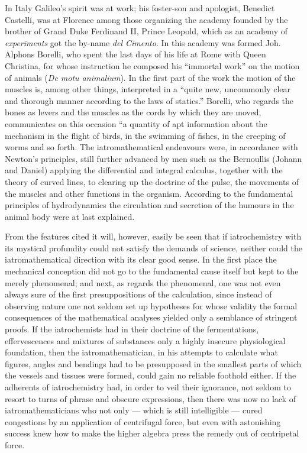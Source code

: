 \documentclass[12pt,a4paper]{book}
\begin{document}
In Italy Galileo's spirit was at work; his foster-son and apologist, Benedict
Castelli, was at Florence among those organizing the academy founded by the
brother of Grand Duke Ferdinand II, Prince Leopold, which as an academy of
\emph{experiments} got the by-name \textit{del Cimento}. In this academy was
formed Joh. Alphons Borelli, who spent the last days of his life at Rome with
Queen Christina, for whose instruction he composed his ``immortal work'' on the
motion of animals (\textit{De motu animalium}). In the first part of the work
the motion of the muscles is, among other things, interpreted in a ``quite new,
uncommonly clear
and thorough manner according to the laws of statics.'' Borelli, who regards
the bones as levers and the muscles as the cords by which they are moved,
communicates on this occasion ``a quantity of apt information about the
mechanism in the flight of birds, in the swimming of fishes, in the creeping of
worms
and so forth.
The iatromathematical endeavours were, in accordance with Newton's principles,
still further advanced by men such as the Bernoullis (Johann and Daniel)
applying the differential and integral calculus, together with the theory of
curved lines, to clearing up the doctrine of the pulse, the movements of the
muscles and other functions in the organism. According to the fundamental
principles of hydrodynamics the circulation and secretion of the humours in the
animal body were at last explained.

From the features cited it will, however, easily be seen that if iatrochemistry
with its mystical profundity could not satisfy the demands of science, neither
could the iatromathematical direction with its clear good sense. In the first
place the mechanical conception did not go to the fundamental cause itself but
kept to the merely phenomenal; and next, as regards the phenomenal, one was not
even always sure of the first presuppositions of the calculation, since instead
of observing nature one not seldom set up hypotheses for whose validity the
formal consequences of the mathematical analyses yielded only a semblance of
stringent proofs. If the iatrochemists had in their doctrine of the
fermentations, effervescences and mixtures of substances only a highly insecure
physiological foundation, then the iatromathematician, in his attempts to
calculate what figures, angles and bendings had to be presupposed in the
smallest parts of which the vessels and tissues were formed, could gain no
reliable foothold either. If the adherents of iatrochemistry had, in order to
veil their ignorance, not seldom to resort to turns of phrase and obscure
expressions, then there was now no lack of iatromathematicians who not only ---
which is still intelligible --- cured congestions by an application of
centrifugal force,
but even with astonishing success knew how to make the higher algebra press the
remedy out of centripetal force.
\end{document}
